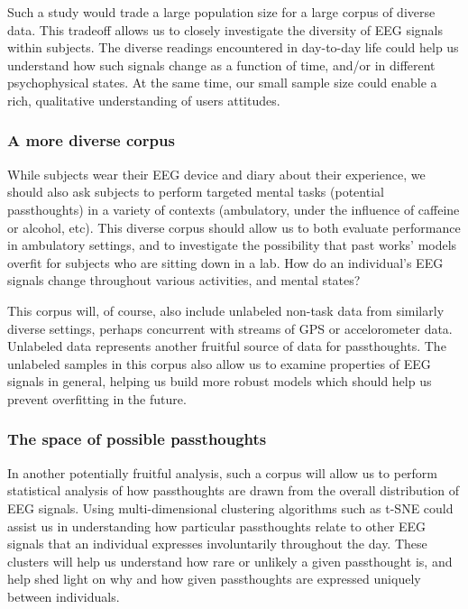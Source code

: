 \documentclass[sigconf]{acmart}
\begin{document}
Such a study would trade a large population size for a large corpus of diverse data.
This tradeoff allows us to closely investigate the diversity of EEG signals within subjects.
The diverse readings encountered in day-to-day life could help us understand how such signals change as a function of time, and/or in different psychophysical states.
At the same time, our small sample size could enable a rich, qualitative understanding of users attitudes.

\subsubsection{A more diverse corpus}
\label{sec:orga8125e2}

While subjects wear their EEG device and diary about their experience, we should also ask subjects to perform
targeted mental tasks (potential passthoughts) in a variety of contexts (ambulatory, under the influence of caffeine or alcohol, etc). 
This diverse corpus should allow us to both evaluate performance in ambulatory settings, and to
investigate the possibility that past works' models overfit for subjects who are sitting down in a lab.
How do an individual's EEG signals change throughout various activities, and mental states?

This corpus will, of course, also include unlabeled non-task data from similarly diverse settings, perhaps concurrent with streams of GPS or accelorometer data.
Unlabeled data represents another fruitful source of data for passthoughts.
The unlabeled samples in this corpus also allow us to examine properties of EEG signals in general, helping us build more robust models which should help us prevent overfitting in the future.

\subsubsection{The space of possible passthoughts}
\label{sec:org8672aa4}
In another potentially fruitful analysis, such a corpus will allow us to perform statistical analysis of how passthoughts are drawn from the overall distribution of EEG signals. 
Using multi-dimensional clustering algorithms such as t-SNE \cite{VanDerMaaten2008} 
could assist us in understanding how particular passthoughts relate to other EEG signals that an individual expresses involuntarily throughout the day. 
These clusters will help us understand how rare or unlikely a given passthought is, and help shed light on why and how given passthoughts are expressed uniquely between individuals.
\end{document}
